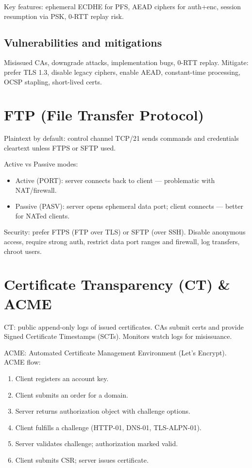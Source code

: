 \documentclass[11pt]{article}
\begin{document}
Key features: ephemeral ECDHE for PFS, AEAD ciphers for auth+enc, session resumption via PSK, 0-RTT replay risk.

\subsection{Vulnerabilities and mitigations}
Misissued CAs, downgrade attacks, implementation bugs, 0-RTT replay. Mitigate: prefer TLS 1.3, disable legacy ciphers, enable AEAD, constant-time processing, OCSP stapling, short-lived certs.

\section{FTP (File Transfer Protocol)}
Plaintext by default: control channel TCP/21 sends commands and credentials cleartext unless FTPS or SFTP used.

Active vs Passive modes:
\begin{itemize}
  \item Active (PORT): server connects back to client — problematic with NAT/firewall.
  \item Passive (PASV): server opens ephemeral data port; client connects — better for NATed clients.
\end{itemize}

Security: prefer FTPS (FTP over TLS) or SFTP (over SSH). Disable anonymous access, require strong auth, restrict data port ranges and firewall, log transfers, chroot users.

\section{Certificate Transparency (CT) \& ACME}
CT: public append-only logs of issued certificates. CAs submit certs and provide Signed Certificate Timestamps (SCTs). Monitors watch logs for misissuance.

ACME: Automated Certificate Management Environment (Let's Encrypt). ACME flow:
\begin{enumerate}
  \item Client registers an account key.
  \item Client submits an order for a domain.
  \item Server returns authorization object with challenge options.
  \item Client fulfills a challenge (HTTP-01, DNS-01, TLS-ALPN-01).
  \item Server validates challenge; authorization marked valid.
  \item Client submits CSR; server issues certificate.
\end{enumerate}
\end{document}

